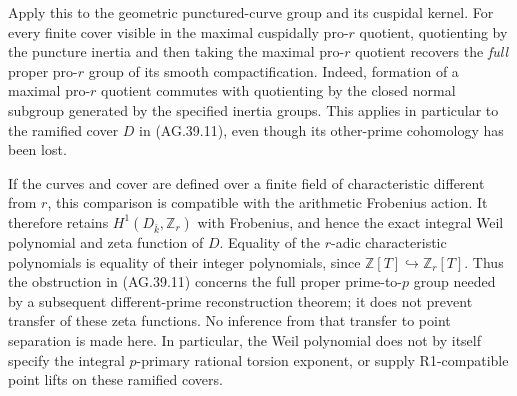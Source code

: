 Apply this to the geometric punctured-curve group and
its cuspidal kernel. For every finite cover visible in
the maximal cuspidally pro-\(r\) quotient, quotienting
by the puncture inertia and then taking the maximal
pro-\(r\) quotient recovers the \emph{full} proper
pro-\(r\) group of its smooth compactification.
Indeed, formation of a maximal pro-\(r\) quotient
commutes with quotienting by the closed normal subgroup
generated by the specified inertia groups. This applies
in particular to the ramified cover \(D\) in
(AG.39.11), even though its other-prime cohomology has
been lost.

If the curves and cover are defined over a finite field
of characteristic different from \(r\), this comparison
is compatible with the arithmetic Frobenius action.
It therefore retains \(H^1(D_{\bar k},\mathbb Z_r)\)
with Frobenius, and hence the exact integral Weil
polynomial and zeta function of \(D\). Equality of the
\(r\)-adic characteristic polynomials is equality of
their integer polynomials, since
\(\mathbb Z[T]\hookrightarrow\mathbb Z_r[T]\).
Thus the obstruction in (AG.39.11) concerns the full
proper prime-to-\(p\) group needed by a subsequent
different-prime reconstruction theorem; it does not
prevent transfer of these zeta functions. No inference
from that transfer to point separation is made here.
In particular, the Weil polynomial does not by itself
specify the integral \(p\)-primary rational torsion
exponent, or supply R1-compatible point lifts on these
ramified covers.

